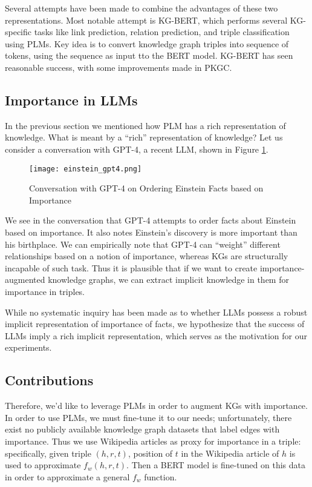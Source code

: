 \documentclass{article}
\begin{document}
Several attempts have been made to combine the advantages of these two representations. Most notable attempt is KG-BERT, which performs several KG-specific tasks like link prediction, relation prediction, and triple classification using PLMs. Key idea is to convert knowledge graph triples into sequence of tokens, using the sequence as input tto the BERT model. KG-BERT has seen reasonable success, with some improvements made in PKGC.

\subsection{Importance in LLMs}
In the previous section we mentioned how PLM has a rich representation of knowledge. What is meant by a ``rich'' representation of knowledge? Let us consider a conversation with GPT-4, a recent LLM, shown in Figure \ref{img1}.

\begin{figure}[h]
  \centering
  \texttt{[image: einstein\_gpt4.png]}
  \caption{Conversation with GPT-4 on Ordering Einstein Facts based on Importance}
  \label{img1}
\end{figure}

We see in the conversation that GPT-4 attempts to order facts about Einstein based on importance. It also notes Einstein's discovery is more important than his birthplace. We can empirically note that GPT-4 can ``weight'' different relationships based on a notion of importance, whereas KGs are structurally incapable of such task. Thus it is plausible that if we want to create importance-augmented knowledge graphs, we can extract implicit knowledge in them for importance in triples.

While no systematic inquiry has been made as to whether LLMs possess a robust implicit representation of importance of facts, we hypothesize that the success of LLMs imply a rich implicit representation, which serves as the motivation for our experiments.

\subsection{Contributions}

Therefore, we'd like to leverage PLMs in order to augment KGs with importance. In order to use PLMs, we must fine-tune it to our needs; unfortunately, there exist no publicly available knowledge graph datasets that label edges with importance. Thus we use Wikipedia articles as proxy for importance in a triple: specifically, given triple $(h,r,t)$, position of $t$ in the Wikipedia article of $h$ is used to approximate $f_w(h,r,t)$. Then a BERT model is fine-tuned on this data in order to approximate a general $f_w$ function.
\end{document}
